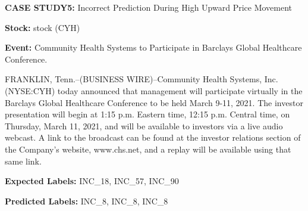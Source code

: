 \documentclass{article}
\begin{document}
\textbf{CASE STUDY5:} Incorrect Prediction During High Upward Price Movement

\textbf{Stock:} stock (CYH)

\textbf{Event:} Community Health Systems to Participate in Barclays Global Healthcare Conference.

FRANKLIN, Tenn.--(BUSINESS WIRE)--Community Health Systems, Inc. (NYSE:CYH) today announced that management will participate virtually in the Barclays Global Healthcare Conference to be held March 9-11, 2021. The investor presentation will begin at 1:15 p.m. Eastern time, 12:15 p.m. Central time, on Thursday, March 11, 2021, and will be available to investors via a live audio webcast. A link to the broadcast can be found at the investor relations section of the Company's website, www.chs.net, and a replay will be available using that same link.

\textbf{Expected Labels:} INC\_18, INC\_57, INC\_90

\textbf{Predicted Labels:} INC\_8, INC\_8, INC\_8

\begin{center}
\end{center}
\end{document}
